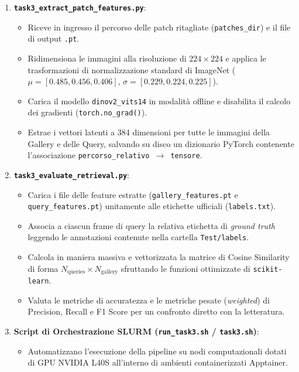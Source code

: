 \documentclass[a4paper,12pt]{report}
\begin{document}
\begin{enumerate}
    \item \textbf{\texttt{task3\_extract\_patch\_features.py}}:
    \begin{itemize}
        \item Riceve in ingresso il percorso delle patch ritagliate (\texttt{patches\_dir}) e il file di output \texttt{.pt}.
        \item Ridimensiona le immagini alla risoluzione di $224 \times 224$ e applica le trasformazioni di normalizzazione standard di ImageNet ($\mu = [0.485, 0.456, 0.406]$, $\sigma = [0.229, 0.224, 0.225]$).
        \item Carica il modello \texttt{dinov2\_vits14} in modalità offline e disabilita il calcolo dei gradienti (\texttt{torch.no\_grad()}).
        \item Estrae i vettori latenti a 384 dimensioni per tutte le immagini della Gallery e delle Query, salvando su disco un dizionario PyTorch contenente l'associazione \texttt{percorso\_relativo $\rightarrow$ tensore}.
    \end{itemize}

    \item \textbf{\texttt{task3\_evaluate\_retrieval.py}}:
    \begin{itemize}
        \item Carica i file delle feature estratte (\texttt{gallery\_features.pt} e \texttt{query\_features.pt}) unitamente alle etichette ufficiali (\texttt{labels.txt}).
        \item Associa a ciascun frame di query la relativa etichetta di \emph{ground truth} leggendo le annotazioni contenute nella cartella \texttt{Test/labels}.
        \item Calcola in maniera massiva e vettorizzata la matrice di Cosine Similarity di forma $N_{\text{queries}} \times N_{\text{gallery}}$ sfruttando le funzioni ottimizzate di \texttt{scikit-learn}.
        \item Valuta le metriche di accuratezza e le metriche pesate (\emph{weighted}) di Precision, Recall e F1 Score per un confronto diretto con la letteratura.
    \end{itemize}

    \item \textbf{Script di Orchestrazione SLURM (\texttt{run\_task3.sh} / \texttt{task3.sh})}:
    \begin{itemize}
        \item Automatizzano l'esecuzione della pipeline su nodi computazionali dotati di GPU NVIDIA L40S all'interno di ambienti containerizzati Apptainer.
    \end{itemize}
\end{enumerate}
\end{document}
